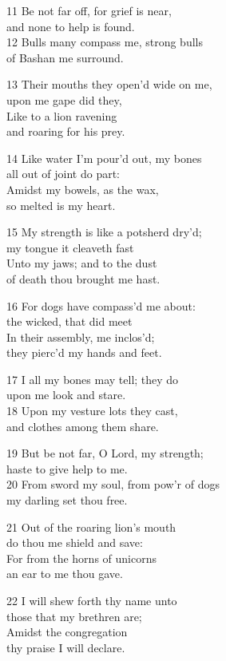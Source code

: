 11 Be not far off, for grief is near,\\
and none to help is found.\\
12 Bulls many compass me, strong bulls\\
of Bashan me surround.

13 Their mouths they open’d wide on me,\\
upon me gape did they,\\
Like to a lion ravening\\
and roaring for his prey.

14 Like water I’m pour’d out, my bones\\
all out of joint do part:\\
Amidst my bowels, as the wax,\\
so melted is my heart.

15 My strength is like a potsherd dry’d;\\
my tongue it cleaveth fast\\
Unto my jaws; and to the dust\\
of death thou brought me hast.

16 For dogs have compass’d me about:\\
the wicked, that did meet\\
In their assembly, me inclos’d;\\
they pierc’d my hands and feet.

17 I all my bones may tell; they do\\
upon me look and stare.\\
18 Upon my vesture lots they cast,\\
and clothes among them share.

19 But be not far, O Lord, my strength;\\
haste to give help to me.\\
20 From sword my soul, from pow’r of dogs\\
my darling set thou free.

21 Out of the roaring lion’s mouth\\
do thou me shield and save:\\
For from the horns of unicorns\\
an ear to me thou gave.

22 I will shew forth thy name unto\\
those that my brethren are;\\
Amidst the congregation\\
thy praise I will declare.

